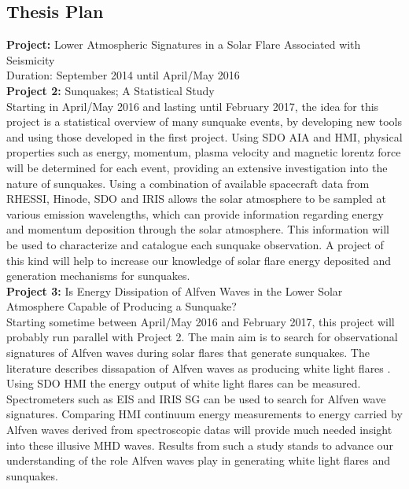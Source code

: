 \subsection{Thesis Plan}
\noindent
\textbf{Project:} Lower Atmospheric Signatures in a Solar Flare Associated with Seismicity\\
Duration: September 2014 until April/May 2016\\
\noindent
\textbf{Project 2:} Sunquakes; A Statistical Study\\
Starting in April/May 2016 and lasting until February 2017, the idea for this project is a statistical overview of many sunquake events, by developing new tools and using those developed in the first project. Using SDO AIA and HMI, physical properties such as energy, momentum, plasma velocity and magnetic lorentz force will be determined for each event, providing an extensive investigation into the nature of sunquakes. Using a combination of available spacecraft data from RHESSI, Hinode, SDO and IRIS allows the solar atmosphere to be sampled at various emission wavelengths, which can provide information regarding energy and momentum deposition through the solar atmosphere. This information will be used to characterize and catalogue each sunquake observation. A project of this kind will help to increase our knowledge of solar flare energy deposited and generation mechanisms for sunquakes.\\
\noindent
\textbf{Project 3:} Is Energy Dissipation of Alfven Waves in the Lower Solar Atmosphere Capable of Producing a Sunquake? \\
Starting sometime between April/May 2016 and February 2017, this project will probably run parallel with Project 2. The main aim is to search for observational signatures of Alfven waves during solar flares that generate sunquakes. The literature describes dissapation of Alfven waves as producing white light flares \citep{1982SoPh...80...99E, 2013AGUFMSH51A2091F}. Using SDO HMI the energy output of white light flares can be measured. Spectrometers such as EIS and IRIS SG can be used to search for Alfven wave signatures. Comparing HMI continuum energy measurements to energy carried by Alfven waves derived from spectroscopic datas will provide much needed insight into these illusive MHD waves. Results from such a study stands to advance our understanding of the role Alfven waves play in generating white light flares and sunquakes.   




